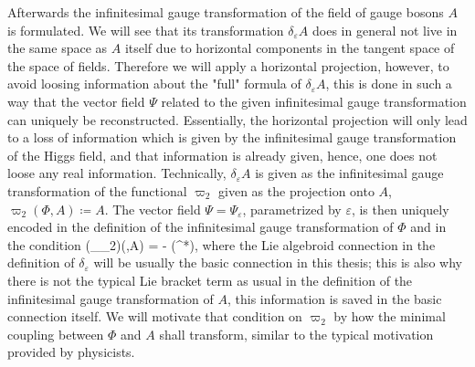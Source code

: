 Afterwards the infinitesimal gauge transformation of the field of gauge bosons $A$ is formulated. We will see that its transformation $\delta_\varepsilon A$ does in general not live in the same space as $A$ itself due to horizontal components in the tangent space of the space of fields. Therefore we will apply a horizontal projection, however, to avoid loosing information about the "full" formula of $\delta_\varepsilon A$, this is done in such a way that the vector field $\Psi$ related to the given infinitesimal gauge transformation can uniquely be reconstructed. Essentially, the horizontal projection will only lead to a loss of information which is given by the infinitesimal gauge transformation of the Higgs field, and that information is already given, hence, one does not loose any real information. Technically, $\delta_\varepsilon A$ is given as the infinitesimal gauge transformation of the functional $\varpi_2$ given as the projection onto $A$, $\varpi_2(\Phi,A) \coloneqq A$. The vector field $\Psi = \Psi_\varepsilon$, parametrized by $\varepsilon$, is then uniquely encoded in the definition of the infinitesimal gauge transformation of $\Phi$ and in the condition
\bas
\mleft(\delta_\varepsilon \varpi_2\mright)(\Phi,A)
=
- (\Phi^*\nabla)\varepsilon,
\eas
where the Lie algebroid connection in the definition of $\delta_\varepsilon$ will be usually the basic connection in this thesis; this is also why there is not the typical Lie bracket term as usual in the definition of the infinitesimal gauge transformation of $A$, this information is saved in the basic connection itself. We will motivate that condition on $\varpi_2$ by how the minimal coupling between $\Phi$ and $A$ shall transform, similar to the typical motivation provided by physicists.


